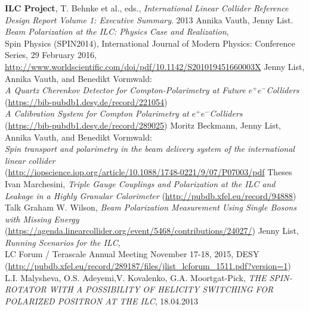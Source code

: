 \documentclass[a4paper]{article}
\begin{document}
\begin{thebibliography}{99}
 \textbf{ILC Project}, T. Behnke et al., eds., \textit{International Linear Collider Reference Design Report Volume 1: Executive Summary}. 2013
 Annika Vauth, Jenny List. \textit{Beam Polarization at the ILC: Physics Case and Realization},\\
Spin Physics (SPIN2014), International Journal of Modern Physics: Conference Series, 29 February 2016,\\
\url{http://www.worldscientific.com/doi/pdf/10.1142/S201019451660003X}
Jenny List, Annika Vauth, and Benedikt Vormwald:\\
	\textit{A Quartz Cherenkov Detector for Compton-Polarimetry at Future $e^{+}e^{-}$Colliders}\\
	(\url{https://bib-pubdb1.desy.de/record/221054})\\
	\textit{A Calibration System for Compton Polarimetry at $e^{+}e^{-}$Colliders}\\
	(\url{https://bib-pubdb1.desy.de/record/289025})
Moritz Beckmann, Jenny List, Annika Vauth, and Benedikt Vormwald:\\
	\textit{Spin transport and polarimetry in the beam delivery system of the international linear collider}\\
	(\url{http://iopscience.iop.org/article/10.1088/1748-0221/9/07/P07003/pdf}
Theses Ivan Marchesini, \textit{Triple Gauge Couplings and Polarization at the ILC and Leakage in a Highly Granular 		Calorimeter}
	(\url{http://pubdb.xfel.eu/record/94888})
Talk Graham W. Wilson, \textit{Beam Polarization Measurement Using Single Bosons
	with Missing Energy}\\
	(\url{https://agenda.linearcollider.org/event/5468/contributions/24027/})
 Jenny List, \textit{Running Scenarios for the ILC},\\
LC Forum / Terascale Annual Meeting November 17-18, 2015, DESY\\
(\url{http://pubdb.xfel.eu/record/289187/files/jlist_lcforum_1511.pdf?version=1})
 L.I. Malysheva, O.S. Adeyemi,V. Kovalenko, G.A. Moortgat-Pick, \textit{THE SPIN-ROTATOR WITH A POSSIBILITY OF HELICITY SWITCHING FOR POLARIZED POSITRON AT THE ILC}, 18.04.2013

\end{thebibliography}
\end{document}
